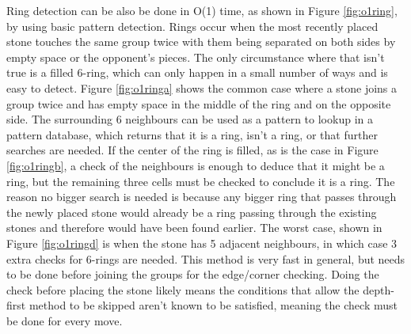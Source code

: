 Ring detection can be also be done in O(1) time, as shown in Figure \ref{fig:o1ring}, by using basic pattern detection. Rings occur when the most recently placed stone touches the same group twice with them being separated on both sides by empty space or the opponent's pieces. The only circumstance where that isn't true is a filled 6-ring, which can only happen in a small number of ways and is easy to detect. Figure \ref{fig:o1ringa} shows the common case where a stone joins a group twice and has empty space in the middle of the ring and on the opposite side. The surrounding 6 neighbours can be used as a pattern to lookup in a pattern database, which returns that it is a ring, isn't a ring, or that further searches are needed. If the center of the ring is filled, as is the case in Figure \ref{fig:o1ringb}, a check of the neighbours is enough to deduce that it might be a ring, but the remaining three cells must be checked to conclude it is a ring. The reason no bigger search is needed is because any bigger ring that passes through the newly placed stone would already be a ring passing through the existing stones and therefore would have been found earlier. The worst case, shown in Figure \ref{fig:o1ringd} is when the stone has 5 adjacent neighbours, in which case 3 extra checks for 6-rings are needed. This method is very fast in general, but needs to be done before joining the groups for the edge/corner checking. Doing the check before placing the stone likely means the conditions that allow the depth-first method to be skipped aren't known to be satisfied, meaning the check must be done for every move.

